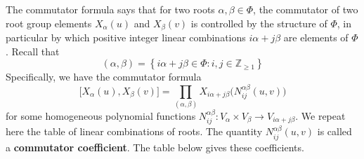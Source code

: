 \documentclass[11pt]{article}
\newcommand{\tbf}{\textbf}
\newcommand{\lb}{\left\{}
\newcommand{\rb}{\right\}}
\newcommand{\Z}{\mathbb{Z}}
\theoremstyle{definition}
\newif\ifsummablepairs
\begin{document}
The commutator formula says that for two roots $\alpha, \beta \in \Phi$, the commutator of two root group elements $X_\alpha(u)$ and $X_\beta(v)$ is controlled by the structure of $\Phi$, in particular by which positive integer linear combinations $i\alpha + j\beta$ are elements of $\Phi$. Recall that
\[
	(\alpha, \beta) = \lb i \alpha + j\beta \in \Phi : i, j \in \Z_{\ge 1} \rb
\]
Specifically, we have the commutator formula
\[
	\Big[ X_\alpha(u), X_\beta(v) \Big] = \prod_{(\alpha, \beta)} X_{i\alpha + j\beta} \Big( N_{ij}^{\alpha \beta}(u,v) \Big)
\]
for some homogeneous polynomial functions $N_{ij}^{\alpha \beta}:V_{\alpha} \times V_{\beta} \to V_{i\alpha+j\beta}$. 
\ifsummablepairs
We repeat here the table of linear combinations of roots. The quantity $N_{ij}^{\alpha \beta}(u,v)$ is called a \tbf{commutator coefficient}. The table below gives these coefficients.

\bigskip
\end{document}
